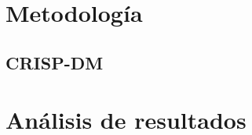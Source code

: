 \chapter{Metodología}
\section{CRISP-DM}
\lipsum[1-10]

\chapter{Análisis de resultados}
\lipsum[1-6]